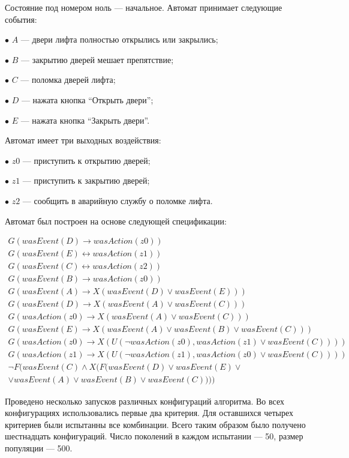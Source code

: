 \documentclass[12pt,fleqn]{article}
\begin{document}
Состояние под номером ноль --- начальное. Автомат принимает следующие события:

$\bullet$ $A$ --- двери лифта полностью открылись или закрылись;

$\bullet$ $B$ --- закрытию дверей мешает препятствие;

$\bullet$ $C$ --- поломка дверей лифта;

$\bullet$ $D$ --- нажата кнопка ``Открыть двери'';

$\bullet$ $E$ --- нажата кнопка ``Закрыть двери''.

Автомат имеет три выходных воздействия:

$\bullet$ $z0$ --- приступить к открытию дверей;

$\bullet$ $z1$ --- приступить к закрытию дверей;

$\bullet$ $z2$ --- сообщить в аварийную службу о поломке лифта.

Автомат был построен на основе следующей спецификации:

\begin{multline*}
G(wasEvent(D) \rightarrow wasAction(z0))\\
G(wasEvent(E) \leftrightarrow wasAction(z1))\\
G(wasEvent(C) \leftrightarrow wasAction(z2))\\
G(wasEvent(B) \rightarrow wasAction(z0))\\
G(wasEvent(A) \rightarrow X(wasEvent(D) \vee wasEvent(E)))\\
G(wasEvent(D) \rightarrow X(wasEvent(A) \vee wasEvent(C)))\\
G(wasAction(z0) \rightarrow X(wasEvent(A) \vee wasEvent(C)))\\
G(wasEvent(E) \rightarrow X(wasEvent(A) \vee wasEvent(B) \vee wasEvent(C)))\\
G(wasAction(z0) \rightarrow X(U(\lnot wasAction(z0), wasAction(z1) \vee wasEvent(C))))\\
G(wasAction(z1) \rightarrow X(U(\lnot wasAction(z1), wasAction(z0) \vee wasEvent(C))))\\
\lnot F(wasEvent(C) \wedge X(F(wasEvent(D) \vee wasEvent(E) \vee \\ \vee wasEvent(A) \vee wasEvent(B) \vee wasEvent(C))))
\end{multline*}

Проведено несколько запусков различных конфигураций алгоритма. Во всех конфигурациях использовались первые два критерия.
Для оставшихся четырех критериев были испытанны все комбинации. Всего таким образом было получено шестнадцать конфигураций.
Число поколений в каждом испытании --- 50, размер популяции --- 500.
\end{document}
